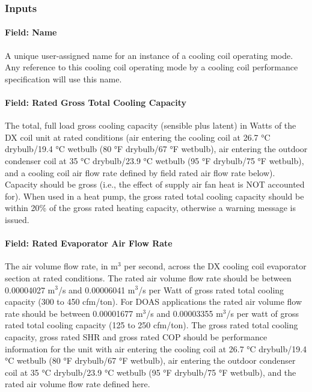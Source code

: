 \subsubsection{Inputs}\label{inputs-03}

\paragraph{Field: Name}\label{field-name-03}

A unique user-assigned name for an instance of a cooling coil operating mode. Any reference to this cooling coil operating mode by a cooling coil performance specification will use this name.

\paragraph{Field: Rated Gross Total Cooling Capacity}\label{field-rated-gross-total-cooling-capacity-1}

The total, full load gross cooling capacity (sensible plus latent) in Watts of the DX coil unit at rated conditions (air entering the cooling coil at 26.7 °C drybulb/19.4 °C wetbulb (80 °F drybulb/67 °F wetbulb), air entering the outdoor condenser coil at 35 °C drybulb/23.9 °C wetbulb (95 °F drybulb/75 °F wetbulb), and a cooling coil air flow rate defined by field rated air flow rate below). Capacity should be gross (i.e., the effect of supply air fan heat is NOT accounted for). When used in a heat pump, the gross rated total cooling capacity should be within 20\% of the gross rated heating capacity, otherwise a warning message is issued.

\paragraph{Field: Rated Evaporator Air Flow Rate}\label{field-rated-evaporator-air-flow-rate-2}

The air volume flow rate, in m\(^{3}\) per second, across the DX cooling coil evaporator section at rated conditions. The rated air volume flow rate should be between 0.00004027 m\(^{3}\)/s and 0.00006041 m\(^{3}\)/s per Watt of gross rated total cooling capacity (300 to 450 cfm/ton). For DOAS applications the rated air volume flow rate should be between 0.00001677 m\(^{3}\)/s and 0.00003355 m\(^{3}\)/s per watt of gross rated total cooling capacity (125 to 250 cfm/ton). The gross rated total cooling capacity, gross rated SHR and gross rated COP should be performance information for the unit with air entering the cooling coil at 26.7 °C drybulb/19.4 °C wetbulb (80 °F drybulb/67 °F wetbulb), air entering the outdoor condenser coil at 35 °C drybulb/23.9 °C wetbulb (95 °F drybulb/75 °F wetbulb), and the rated air volume flow rate defined here.

